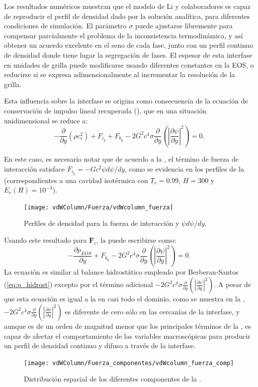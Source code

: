 Los resultados num\'ericos muestran que el modelo \pp{} de Li y colaboradores es capaz de reproducir el perfil de densidad dado por la soluci\'on anal\'itica, para diferentes condiciones de simulaci\'on. El par\'ametro $\sigma$ puede ajustarse libremente para compensar parcialmente el problema de la inconsistencia termodin\'amica, y as\'i obtener un acuerdo excelente en el seno de cada fase, junto con un perfil continuo de densidad donde tiene lugar la segregaci\'on de fases. El espesor de esta interfase en unidades de grilla puede modificarse usando diferentes constantes en la EOS, o reducirse si se expresa adimensionalmente al incrementar la resoluci\'on de la grilla.

Esta influencia sobre la interfase se origina como consecuencia de la ecuaci\'on de conservaci\'on de impulso lineal recuperada (), que en una situaci\'on unidimensional se reduce a:
\begin{equation}
	-\dfrac{\partial}{\partial y}(\rho c_s^2) + F_{i_y} + F_{b_y} - 2 G^2 c^4 \sigma \dfrac{\partial}{\partial y} \left( \left| \dfrac{\partial \psi}{\partial y} \right|^2  \right) = 0.
	\label{eq:li_macro_1d}
\end{equation}


En este caso, es necesario notar que de acuerdo a la , el t\'ermino de fuerza de interacci\'on satisface $F_{i_y} = -Gc^2 \psi d\psi / dy$, como se evidencia en los perfiles de la  (correspondientes a una cavidad isot\'ermica con $T_r = 0.99$, $H=300$ y $E_r(H)=10^{-3}$). 
\begin{figure}[ht]
	\centering
	\texttt{[image: vdWColumn/Fuerza/vdWcolumn\_fuerza]}
	\caption{Perfiles de densidad para la fuerza de interacci\'on y $\psi d\psi / dy$.}
	\label{fig:vdWColumn_TUniform_fuerza}
\end{figure}

Usando este resultado para $\bm{F}_i$, la  puede escribirse como:
\begin{equation}
	-\dfrac{\partial p_{EOS}}{\partial y} + F_{b_y} - 2 G^2 c^4 \sigma \dfrac{\partial}{\partial y} \left( \left| \dfrac{\partial \psi}{\partial y} \right|^2  \right) = 0.
	\label{eq:li_macro_1d_peos}
\end{equation}
La ecuaci\'on es similar al balance hidrost\'atico empleado por Berberan-Santos (\ref{eq:p_hidrost}) excepto por el t\'ermino adicional $- 2 G^2 c^4 \sigma \frac{\partial}{\partial y} \left( \left| \frac{\partial \psi}{\partial y} \right|^2  \right)$. A pesar de que esta ecuaci\'on es igual a la  en casi todo el dominio, como se muestra en la , $- 2 G^2 c^4 \sigma \frac{\partial}{\partial y} \left( \left| \frac{\partial \psi}{\partial y} \right|^2  \right)$ es diferente de cero s\'olo en las cercan\'ias de la interfase, y aunque es de un orden de magnitud menor que los principales t\'erminos de la , es capaz de afectar el comportamiento de las variables macrosc\'opicas para producir un perfil de densidad continuo y difuso a trav\'es de la interfase.


\begin{figure}[ht]
	\centering
	\texttt{[image: vdWColumn/Fuerza\_componentes/vdWcolumn\_fuerza\_comp]}
	\caption{Distribuci\'on espacial de los diferentes componentes de la .}
	\label{fig:vdWColumn_fuerza_terminos}
\end{figure}
\FloatBarrier